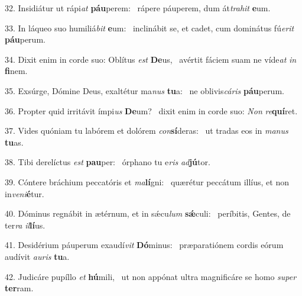 32. Insidiátur ut rápi\textit{at} \textbf{páu}perem: \ast\  rápere páuperem, dum át\textit{tra}\textit{hit} \textbf{e}um.\

33. In láqueo suo humiliá\textit{bit} \textbf{e}um: \ast\  inclinábit se, et cadet, cum dominátus fú\textit{e}\textit{rit} \textbf{páu}perum.\

34. Dixit enim in corde suo: Oblítus \textit{est} \textbf{De}us, \ast\  avértit fáciem suam ne víde\textit{at} \textit{in} \textbf{fi}nem.\

35. Exsúrge, Dómine Deus, exaltétur ma\textit{nus} \textbf{tu}a: \ast\  ne oblivis\textit{cá}\textit{ris} \textbf{páu}perum.\

36. Propter quid irritávit ímpi\textit{us} \textbf{De}um? \ast\  dixit enim in corde suo: \textit{Non} \textit{re}\textbf{quí}ret.\

37. Vides quóniam tu labórem et dolórem \textit{con}\textbf{sí}deras: \ast\  ut tradas eos in \textit{ma}\textit{nus} \textbf{tu}as.\

38. Tibi derelíctus \textit{est} \textbf{pau}per: \ast\  órphano tu e\textit{ris} \textit{ad}\textbf{jú}tor.\

39. Cóntere bráchium peccatóris et \textit{ma}\textbf{lí}gni: \ast\  quærétur peccátum illíus, et non in\textit{ve}\textit{ni}\textbf{é}tur.\

40. Dóminus regnábit in ætérnum, et in sǽcu\textit{lum} \textbf{sǽ}culi: \ast\  períbitis, Gentes, de ter\textit{ra} \textit{il}\textbf{lí}us.\

41. Desidérium páuperum exaudí\textit{vit} \textbf{Dó}minus: \ast\  præparatiónem cordis eórum audívit \textit{au}\textit{ris} \textbf{tu}a.\

42. Judicáre pupíllo \textit{et} \textbf{hú}mili, \ast\  ut non appónat ultra magnificáre se homo \textit{su}\textit{per} \textbf{ter}ram.\

